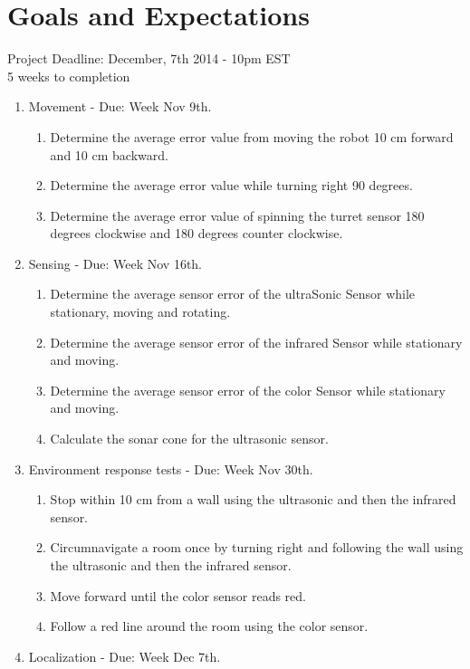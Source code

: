 \documentclass[DIV=calc, paper=a4, fontsize=11pt, onecolumn]{scrartcl}	 %
\begin{document}
\section*{Goals and Expectations}
Project Deadline: December, 7th 2014 - 10pm EST\\
5 weeks to completion\\

\begin{enumerate}
\item Movement - Due: Week Nov 9th.
  \begin{enumerate}
    \item Determine the average error value from moving the robot 10 cm forward and 10 cm backward.
    \item Determine the average error value while turning right 90 degrees.
    \item Determine the average error value of spinning the turret sensor 180 degrees clockwise and 180 degrees counter clockwise.
  \end{enumerate}
\item Sensing - Due: Week Nov 16th.
  \begin{enumerate}
    \item Determine the average sensor error of the ultraSonic Sensor while stationary, moving and rotating.
    \item Determine the average sensor error of the infrared Sensor while stationary and moving.
    \item Determine the average sensor error of the color Sensor while stationary and moving.    
    \item Calculate the sonar cone for the ultrasonic sensor.
  \end{enumerate}
\item Environment response tests - Due: Week Nov 30th.
  \begin{enumerate}
    \item Stop within 10 cm from a wall using the ultrasonic and then the infrared sensor.
    \item Circumnavigate a room once by turning right and following the wall using the ultrasonic and then the infrared sensor.
    \item Move forward until the color sensor reads red.
    \item Follow a red line around the room using the color sensor.
  \end{enumerate}
\item Localization - Due: Week Dec 7th.
  \begin{enumerate}

\end{enumerate}
\end{enumerate}
\end{document}
